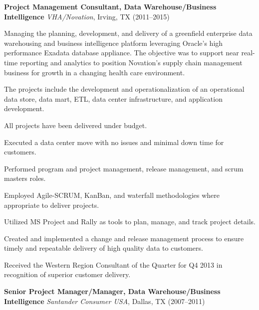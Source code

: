 \documentclass{article}
\newcommand{\sbt}{\,\begin{picture}(-1,1)(-1,-3)\circle*{3}\end{picture}\ }
\begin{document}
\noindent
{\bfseries Project Management Consultant, Data Warehouse/Business Intelligence} {\itshape VHA/Novation}, Irving, TX (2011--2015)
\begin{compactitem}

\item[\sbt] Managing the planning, development, and delivery of a greenfield enterprise data warehousing and business intelligence platform leveraging Oracle's high performance Exadata database appliance. The objective was to support near real-time reporting and analytics to position Novation's supply chain management business for growth in a changing health care environment.
\item[\sbt] The projects include the development and operationalization of an operational data store, data mart, ETL, data center infrastructure, and application development.
\item[\sbt] All projects have been delivered under budget.
\item[\sbt] Executed a data center move with no issues and minimal down time for customers.
\item[\sbt] Performed program and project management, release management, and scrum masters roles.
\item[\sbt] Employed Agile-SCRUM, KanBan, and waterfall methodologies where appropriate to deliver projects.
\item[\sbt] Utilized MS Project and Rally as tools to plan, manage, and track project details.
\item[\sbt] Created and implemented a change and release management process to ensure timely and repeatable delivery of high quality data to customers.
\item[\sbt] Received the Western Region Consultant of the Quarter for Q4 2013 in recognition of superior customer delivery.

\end{compactitem}

\smallskip

\noindent
{\bfseries Senior Project Manager/Manager, Data Warehouse/Business Intelligence} {\itshape Santander Consumer USA}, Dallas, TX (2007--2011)
\end{document}
